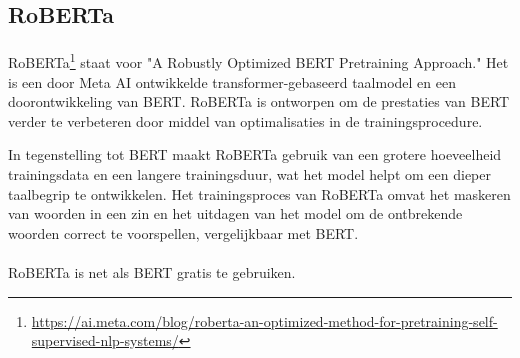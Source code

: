 \subsection{RoBERTa}%

\paragraph{}
RoBERTa\footnote{\href{https://ai.meta.com/blog/roberta-an-optimized-method-for-pretraining-self-supervised-nlp-systems/}{https://ai.meta.com/blog/roberta-an-optimized-method-for-pretraining-self-supervised-nlp-systems/}} staat voor "A Robustly Optimized BERT Pretraining Approach." Het is een door Meta AI ontwikkelde transformer-gebaseerd taalmodel en een doorontwikkeling van BERT. RoBERTa is ontworpen om de prestaties van BERT verder te verbeteren door middel van optimalisaties in de trainingsprocedure.

In tegenstelling tot BERT maakt RoBERTa gebruik van een grotere hoeveelheid trainingsdata en een langere trainingsduur, wat het model helpt om een dieper taalbegrip te ontwikkelen. Het trainingsproces van RoBERTa omvat het maskeren van woorden in een zin en het uitdagen van het model om de ontbrekende woorden correct te voorspellen, vergelijkbaar met BERT.

\paragraph{}
RoBERTa is net als BERT gratis te gebruiken.


%
%
%
